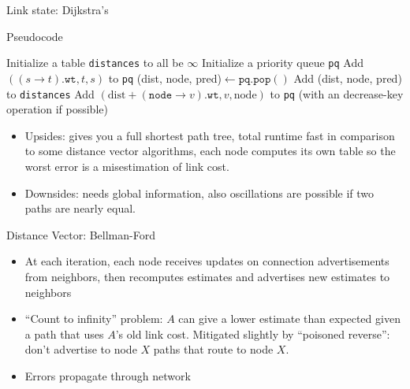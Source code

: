 \documentclass{beamer}
\begin{document}
\begin{frame}[t]{Link state: Dijkstra's}
    \begin{exampleblock}{Pseudocode}
        \begin{algorithmic}[1]
                \State Initialize a table \texttt{distances} to all be $\infty$
                \State Initialize a priority queue \texttt{pq}
                    \State Add $((s \rightarrow t).\texttt{wt}, t, s)$ to \texttt{pq}
                \EndFor
                    \State (dist, node, pred)$\gets\texttt{pq.pop}()$
                    \State Add (dist, node, pred) to \texttt{distances}
                            \State Add $(\text{dist} + (\texttt{node} \rightarrow v).\texttt{wt}, v, \text{node})$ to \texttt{pq} (with an \alert{decrease-key} operation if possible)
                        \EndIf
                    \EndFor
                \EndWhile
            \EndProcedure
        \end{algorithmic}
    \end{exampleblock}
    \begin{itemize}
        \pause\item \alert{Upsides}: gives you a full shortest path tree, total runtime fast in comparison to some distance vector algorithms, each node computes its own table so the worst error is a misestimation of link cost.
        \pause\item \alert{Downsides}: needs global information, also oscillations are possible if two paths are nearly equal.
    \end{itemize}
\end{frame}

\begin{frame}[t]{Distance Vector: Bellman-Ford}
    \begin{itemize}
        \begin{exampleblock}{Update Rule}
            $$d(s, t) = \min_{s\rightarrow v}(d(v, t) + (s\rightarrow v).\texttt{wt})$$
        \end{exampleblock}
        \pause \item At each iteration, each node receives updates on connection advertisements from neighbors, then recomputes estimates and advertises new estimates to neighbors
        \pause \item ``Count to infinity'' problem: $A$ can give a lower estimate than expected given a path that uses $A$'s old link cost. Mitigated slightly by ``poisoned reverse'': don't advertise to node $X$ paths that route to node $X$.
        \pause \item Errors propagate through network 
    \end{itemize}
\end{frame}
\end{document}
